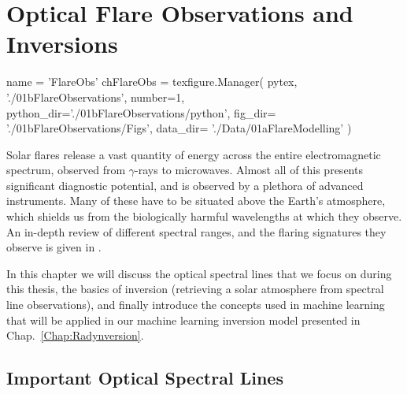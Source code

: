 \chapter{Optical Flare Observations and Inversions}\label{Chap:FlareObservations}
\begin{pycode}[FlareObs]
name = 'FlareObs'
chFlareObs = texfigure.Manager(
    pytex,
    './01bFlareObservations',
    number=1,
    python_dir='./01bFlareObservations/python',
    fig_dir=   './01bFlareObservations/Figs',
    data_dir=  './Data/01aFlareModelling'
)
\end{pycode}


Solar flares release a vast quantity of energy across the entire electromagnetic spectrum, observed from $\gamma$-rays to microwaves.
Almost all of this presents significant diagnostic potential, and is observed by a plethora of advanced instruments.
Many of these have to be situated above the Earth's atmosphere, which shields us from the biologically harmful wavelengths at which they observe.
An in-depth review of different spectral ranges, and the flaring signatures they observe is given in \citet{Fletcher2011}.

In this chapter we will discuss the optical spectral lines that we focus on during this thesis, the basics of inversion (retrieving a solar atmosphere from spectral line observations), and finally introduce the concepts used in machine learning that will be applied in our machine learning inversion model presented in Chap.~\ref{Chap:Radynversion}.

\section{Important Optical Spectral Lines}

